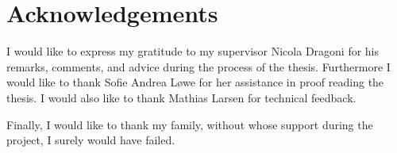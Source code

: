 \chapter{Acknowledgements}
	I would like to express my gratitude to my supervisor Nicola Dragoni for his remarks, comments, and advice during the process of the thesis. Furthermore I would like to thank Sofie Andrea Løwe for her assistance in proof reading the thesis. I would also like to thank Mathias Larsen for technical feedback.

	Finally, I would like to thank my family, without whose support during the project, I surely would have failed.